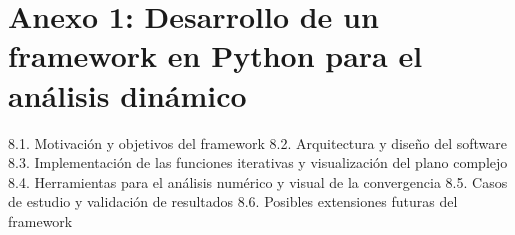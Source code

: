 \documentclass[12pt,a4paper,spanish]{book}
\makeatletter
\def\cleardoublepage{\clearpage\if@twoside\ifodd\c@page\else
    \hbox{}
    \vspace*{\fill}
    \vspace{\fill}
    \thispagestyle{empty}
    \newpage
    \if@twocolumn\hbox{}\newpage\fi\fi\fi}
\theoremstyle{plain}
\theoremstyle{definition}
\theoremstyle{remark}
\makeatother
\begin{document}
%



\backmatter

\chapter{Anexo 1: Desarrollo de un framework en Python para el análisis dinámico} 

8.1. Motivación y objetivos del framework
8.2. Arquitectura y diseño del software
8.3. Implementación de las funciones iterativas y visualización del plano complejo
8.4. Herramientas para el análisis numérico y visual de la convergencia
8.5. Casos de estudio y validación de resultados
8.6. Posibles extensiones futuras del framework




\backmatter

\frenchspacing

\cleardoublepage %
\chaptermark{\bibname}

\end{document}
